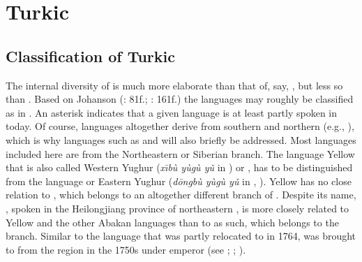 \section{Turkic}\label{sec:5.11}
\subsection{Classification of Turkic}

The internal diversity of  is much more elaborate than that of, say, , but less so than . Based on Johanson (\citeyear{Johanson1998}: 81f.; \citeyear{Johanson2006a}: 161f.) the languages may roughly be classified as in .
	An asterisk indicates that a given language is at least partly spoken in  today. Of course,  languages altogether derive from southern  and northern  (e.g., \citealt{Yunusbayev2015}), which is why languages such as  and  will also briefly be addressed. Most languages included here are from the Northeastern or Siberian branch. The  language Yellow  that is also called Western Yughur (\textit{x\={\i}bù yùgù yǔ}   in ) or , has to be distinguished from the  language  or Eastern Yughur (\textit{d\=o}\textit{ngbù yùgù yǔ}   in , ). Yellow  has no close relation to , which belongs to an altogether different branch of . Despite its name,  , spoken in the Heilongjiang province of northeastern , is more closely related to Yellow  and the other Abakan  languages than to  as such, which belongs to the  branch. Similar to the  language  that was partly relocated to  in 1764,  was brought to  from the  region in the 1750s under emperor  (see \citealt{HuZhenhua1986,Hu1996}; \citealt{HuImart1987}; \citealt{Janhunen1996}).

